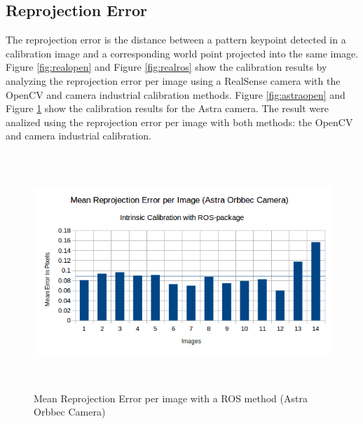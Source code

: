 \subsection{Reprojection Error}

The reprojection error is the distance between a pattern keypoint detected in a calibration image and a corresponding world point projected into the same image. Figure \ref{fig:realopen} and Figure \ref{fig:realros} show the calibration results by analyzing the reprojection error per image using a RealSense camera with the OpenCV and camera \textunderscore industrial calibration methods. Figure \ref{fig:astraopen} and Figure \ref{fig:astraros} show the calibration results for the Astra camera. The result were analized using the reprojection error per image with both methods: the OpenCV and camera \textunderscore industrial calibration.



\begin{figure}[!h]
\begin{center}
\includegraphics[width=5in, height=3.5in]{figures05/ros_int_cal_astra.png}
\caption{Mean Reprojection Error per image with a ROS method (Astra Orbbec Camera)}%
\label{fig:astraros}
\end{center}
\end{figure}

